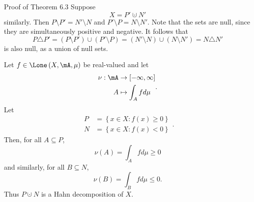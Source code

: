 \documentclass[pmath451]{subfiles}
\begin{document}
\begin{boxyproof}{Proof of Theorem 6.3}
        Suppose
        \begin{equation*}
            X = P'\cupdot N'
        \end{equation*}
        similarly. Then $P\setminus P' = N'\setminus N$ and $P'\setminus P = N\setminus N'$. Note that the sets are null, since they are simultaneously positive and negative. It follows that
        \begin{equation*}
            P\triangle P' = \left( P\setminus P' \right) \cup \left( P'\setminus P \right) = \left( N'\setminus N \right)\cup\left( N\setminus N' \right) = N\triangle N'
        \end{equation*}
        is also null, as a union of null sets.
    \end{boxyproof}
    
    \begin{example}{}
        Let $f\in\Lone\left( X,\mA,\mu \right)$ be real-valued and let
        \begin{equation*}
            \begin{aligned}
                \nu:\mA&\to\left[ -\infty,\infty \right] \\
                A&\mapsto\int_Afd\mu
            \end{aligned} .
        \end{equation*}
        Let
        \begin{equation*}
            \begin{aligned}
                P & = \left\lbrace x\in X: f\left( x \right)\geq 0 \right\rbrace \\
                N & = \left\lbrace x\in X: f\left( x \right) < 0 \right\rbrace
            \end{aligned} .
        \end{equation*}
        Then, for all $A\subseteq P$,
        \begin{equation*}
            \nu\left( A \right) = \int_Afd\mu \geq 0
        \end{equation*}
        and similarly, for all $B\subseteq N$,
        \begin{equation*}
            \nu\left( B \right) = \int_Bfd\mu\leq 0.
        \end{equation*}
        Thus $P\cupdot N$ is a Hahn decomposition of $X$.


\end{example}
\end{document}
